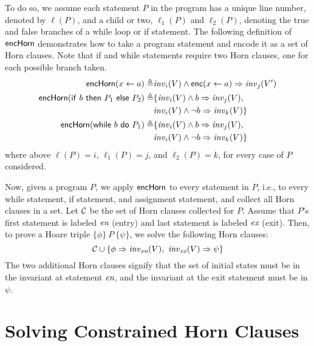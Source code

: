 \documentclass{amsart}
\theoremstyle{definition}
\theoremstyle{remark}
\numberwithin{equation}{section}
\begin{document}
To do so, we assume each statement $P$ in the program has a unique
line number, denoted by $\ell(P)$, and a child or two, $\ell_1(P)$
and $\ell_2(P)$, denoting the true and false branches of a while loop
or if statement.
The following definition of $\mathsf{encHorn}$ demonstrates
how to take a program statement and encode it as a set of Horn clauses.
Note that if and while statements require two Horn clauses,
one for each possible branch taken.
%
\begin{align*}
  \mathsf{encHorn}(x \gets a) \triangleq&  \mathit{inv}_i(V) \land \mathsf{enc}(x \gets a) \Rightarrow \mathit{inv}_j(V')\\
  \mathsf{encHorn}(\mathsf{if} \ b \ \mathsf{then} \ P_1 \ \mathsf{else} \ P_2) \triangleq&
    \{\mathit{inv}_i(V) \land b \Rightarrow \mathit{inv}_j(V), \\
    & \mathit{inv}_i(V) \land \neg b \Rightarrow \mathit{inv}_k(V)\}\\
    \mathsf{encHorn}(\mathsf{while} \ b \ \mathsf{do} \ P_1) \triangleq&
      \{\mathit{inv}_i(V) \land b \Rightarrow \mathit{inv}_j(V), \\
      & \mathit{inv}_i(V) \land \neg b \Rightarrow \mathit{inv}_k(V)\}
\end{align*}
where above $\ell(P) = i$, $\ell_1(P) = j$, and $\ell_2(P) = k$,
for every case of $P$ considered.

Now, given a program $P$, we apply $\mathsf{encHorn}$ to every statement
in $P$, i.e., to every while statement, if statement, and assignment
statement, and collect all Horn clauses in a set.
Let $\mathcal{C}$ be the set of Horn clauses collected for $P$.
Assume that $P$'s first statement is labeled $\emph{en}$ (entry) and last statement
is labeled $\emph{ex}$ (exit).
Then, to prove a Hoare triple $\{\phi\} \ P  \ \{\psi\}$,
we solve the following Horn clauses:
%
$$ \mathcal{C} \cup \{\phi \Rightarrow \mathit{inv}_{\emph{en}}(V), \  \mathit{inv}_{\emph{ex}}(V) \Rightarrow \psi\}$$
%
The two additional Horn clauses signify that the set of initial states
must be in the invariant at statement $\emph{en}$, and the
invariant at the exit statement must be in $\psi$.

\section{Solving Constrained Horn Clauses}
\end{document}
